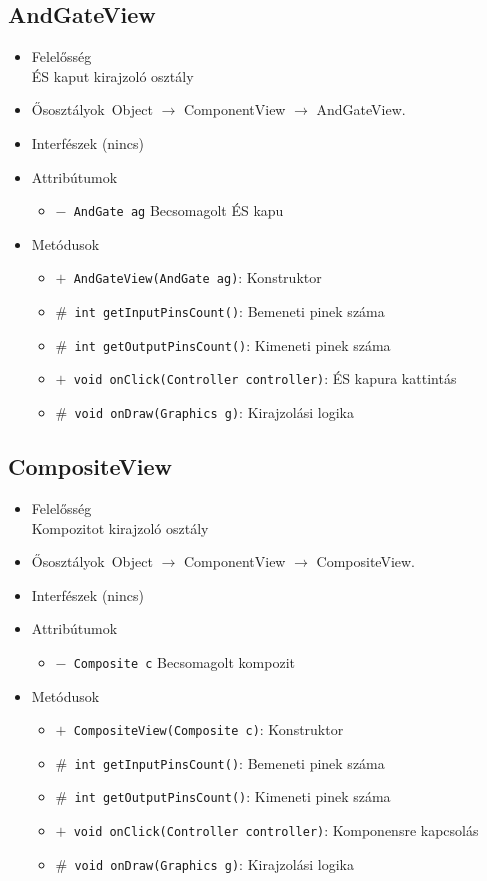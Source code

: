 \subsection{AndGateView}
\begin{itemize}
\item Felelősség\\
ÉS kaput kirajzoló osztály
\item Ősosztályok\ Object $\rightarrow{}$ ComponentView $\rightarrow{}$ AndGateView.
\item Interfészek (nincs)
\item Attribútumok $\ $
\begin{itemize}
	\item[] \texttt{$-$ AndGate ag} Becsomagolt ÉS kapu
\end{itemize}
\item Metódusok$\ $
\begin{itemize}
	\item[] \texttt{$+$ AndGateView(AndGate ag)}: Konstruktor
	\item[] \texttt{$\#$ int getInputPinsCount()}: Bemeneti pinek száma
	\item[] \texttt{$\#$ int getOutputPinsCount()}: Kimeneti pinek száma
	\item[] \texttt{$+$ void onClick(Controller controller)}: ÉS kapura kattintás
	\item[] \texttt{$\#$ void onDraw(Graphics g)}: Kirajzolási logika
\end{itemize}
\end{itemize}

\subsection{CompositeView}
\begin{itemize}
\item Felelősség\\
Kompozitot kirajzoló osztály
\item Ősosztályok\ Object $\rightarrow{}$ ComponentView $\rightarrow{}$ CompositeView.
\item Interfészek (nincs)
\item Attribútumok $\ $
\begin{itemize}
	\item[] \texttt{$-$ Composite c} Becsomagolt kompozit
\end{itemize}
\item Metódusok$\ $
\begin{itemize}
	\item[] \texttt{$+$ CompositeView(Composite c)}: Konstruktor
	\item[] \texttt{$\#$ int getInputPinsCount()}: Bemeneti pinek száma
	\item[] \texttt{$\#$ int getOutputPinsCount()}: Kimeneti pinek száma
	\item[] \texttt{$+$ void onClick(Controller controller)}: Komponensre kapcsolás
	\item[] \texttt{$\#$ void onDraw(Graphics g)}: Kirajzolási logika
\end{itemize}
\end{itemize}

